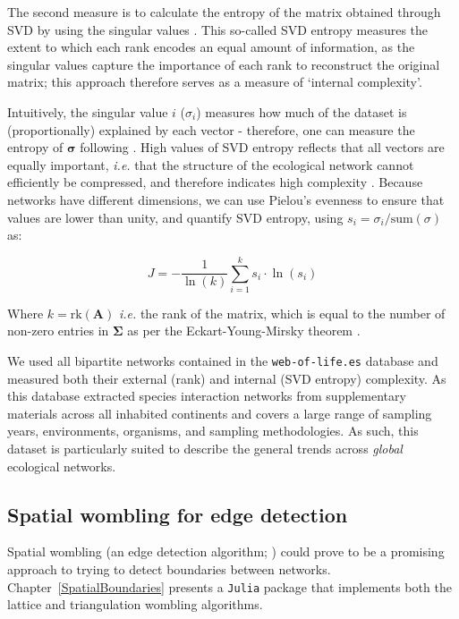 The second measure is to calculate the entropy of the matrix obtained
through SVD by using the singular values \cite{@Shannon1948MatThe}. This
so-called SVD entropy measures the extent to which each rank encodes an
equal amount of information, as the singular values capture the
importance of each rank to reconstruct the original matrix; this
approach therefore serves as a measure of `internal complexity'.

Intuitively, the singular value $i$ ($\sigma_i$) measures how much
of the dataset is (proportionally) explained by each vector - therefore,
one can measure the entropy of \(\mathbf{\sigma}\) following
\cite{Shannon1948MatThe}. High values of SVD entropy reflects that all vectors
are equally important, \emph{i.e.} that the structure of the ecological
network cannot efficiently be compressed, and therefore indicates high
complexity \cite{Gu2016HowLon}. Because networks have different
dimensions, we can use Pielou's evenness \cite{Pielou1975EcoDiv} to
ensure that values are lower than unity, and quantify SVD entropy, using
$s_i = \sigma_i/\text{sum}(\sigma)$ as:

$$J = -\frac{1}{\ln(k)}\sum_{i=1}^k s_i\cdot\ln(s_i)$$

Where \(k = \text{rk}(\mathbf{A})\) \emph{i.e.} the rank of the matrix,
which is equal to the number of non-zero entries in \(\mathbf{\Sigma}\)
as per the Eckart-Young-Mirsky theorem \cite{Eckart1936AppOne,
Golub1987GenEck}. 

We used all bipartite networks contained in the \texttt{web-of-life.es}
database and measured both their external (rank) and internal (SVD entropy)
complexity. As this database extracted species interaction networks from
supplementary materials across all inhabited continents and covers a large range
of sampling years, environments, organisms, and sampling methodologies. As such,
this dataset is particularly suited to describe the general trends across
\emph{global} ecological networks.

\subsection{Spatial wombling for edge detection}

Spatial wombling (an edge detection algorithm; \cite{Womble1951DifSys}) could
prove to be a promising approach to trying to detect boundaries between
networks. Chapter~\ref{SpatialBoundaries} presents a \texttt{Julia} package that
implements both the lattice and triangulation wombling algorithms. 

